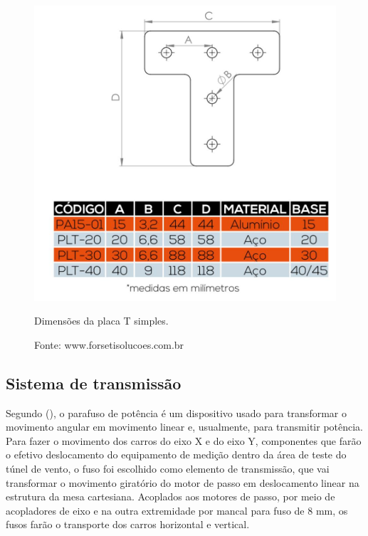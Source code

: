 \begin{figure}[!htb]
\centering
\includegraphics[scale = 0.35]{figuras/3-10}
\caption{Dimensões da placa T simples.}
\caption*{Fonte: www.forsetisolucoes.com.br}
\label{fig:placatd}
\end{figure}
    
\subsection{Sistema de transmissão}\label{subsec:mettransmissao}

Segundo \citeauthor{budynas2016elementos} (\citeyear{budynas2016elementos}), o parafuso de potência é um dispositivo usado para transformar 
o movimento angular em movimento linear e, usualmente, para transmitir potência. Para fazer o movimento 
dos carros do eixo X e do eixo Y, componentes que farão o efetivo deslocamento do equipamento de medição 
dentro da área de teste do túnel de vento, o fuso foi escolhido como elemento de transmissão, que vai 
transformar o movimento giratório do motor de passo em deslocamento linear na estrutura da mesa cartesiana. 
Acoplados aos motores de passo, por meio de acopladores de eixo e na outra extremidade por mancal para fuso 
de 8 mm, os fusos farão o transporte dos carros horizontal e vertical. 

